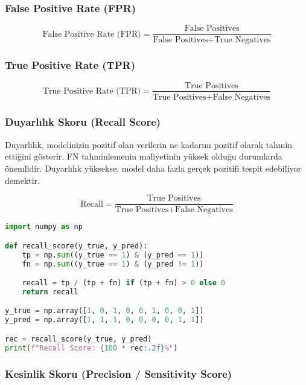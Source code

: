 \newpage

\subsubsection{False Positive Rate (FPR)} 

\[\text{False Positive Rate (FPR)} = \frac{\text{False Positives}}{\text{False Positives} + \text{True Negatives}}\]

\newpage

\subsubsection{True Positive Rate (TPR)}

\[\text{True Positive Rate (TPR)} = \frac{\text{True Positives}}{\text{True Positives} + \text{False Negatives}}\]

\newpage

\subsubsection{Duyarlılık Skoru (Recall Score)}

Duyarlılık, modelinizin pozitif olan verilerin ne kadarını pozitif olarak tahmin ettiğini gösterir. FN tahminlemenin maliyetinin yüksek olduğu durumlarda önemlidir. Duyarlılık yüksekse, model daha fazla gerçek pozitifi tespit edebiliyor demektir.

\[\text{Recall} = \frac{\text{True Positives}}{\text{True Positives} + \text{False Negatives}}\]

\begin{lstlisting}[language=Python]
import numpy as np

def recall_score(y_true, y_pred):
    tp = np.sum((y_true == 1) & (y_pred == 1))
    fn = np.sum((y_true == 1) & (y_pred != 1))

    recall = tp / (tp + fn) if (tp + fn) > 0 else 0
    return recall

y_true = np.array([1, 0, 1, 0, 0, 1, 0, 0, 1])
y_pred = np.array([1, 1, 1, 0, 0, 0, 0, 1, 1])

rec = recall_score(y_true, y_pred)
print(f"Recall Score: {100 * rec:.2f}%")
\end{lstlisting}

\newpage

\subsubsection{Kesinlik Skoru (Precision / Sensitivity Score)}

